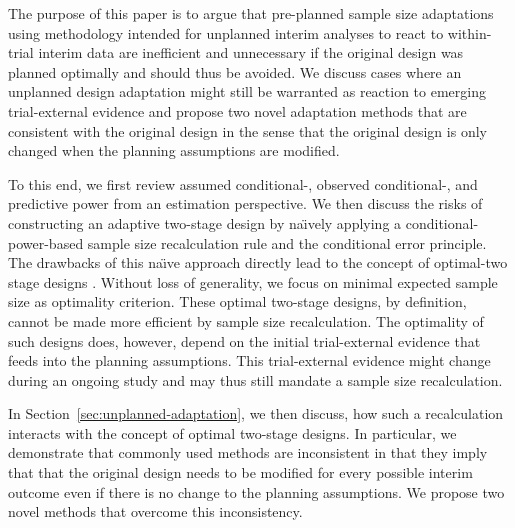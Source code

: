 \documentclass[12pt]{article}
\begin{document}
The purpose of this paper is to argue that pre-planned sample size adaptations
using methodology intended for unplanned interim analyses to react to within-trial interim data are inefficient and unnecessary if the original design was planned optimally and should thus be avoided.
We discuss cases where an unplanned design adaptation might still be warranted as reaction to emerging trial-external evidence and
propose two novel adaptation methods that are consistent with the original design in the sense that the original design is only changed when the planning assumptions are modified.

To this end, we first review assumed \mbox{conditional-,} observed \mbox{conditional-,} and predictive power
from an estimation perspective.
We then discuss the risks of constructing an
adaptive two-stage design by na\"{\i}vely applying
a conditional-power-based sample size recalculation rule and the
conditional error principle.
The drawbacks of this na\"{\i}ve approach directly lead to the
concept of optimal-two stage designs \cite{brannath2004,pilz2019,adoptrjss2020}.
Without loss of generality, we focus on minimal expected sample size as optimality criterion.
These optimal two-stage designs, by definition, cannot be made more
efficient by sample size recalculation.
The optimality of such designs does, however, depend on the initial trial-external evidence that feeds into the planning assumptions.
This trial-external evidence might change during an ongoing study
and may thus still mandate a sample size recalculation.

In Section~\ref{sec:unplanned-adaptation},
we then discuss,
how such a recalculation interacts with the concept of
optimal two-stage designs.
In particular, we demonstrate that commonly used methods
are inconsistent in that they imply that that the original design needs to be modified for every possible interim outcome even if there is no change to the planning assumptions.
We propose two novel methods that overcome this inconsistency.
\end{document}
